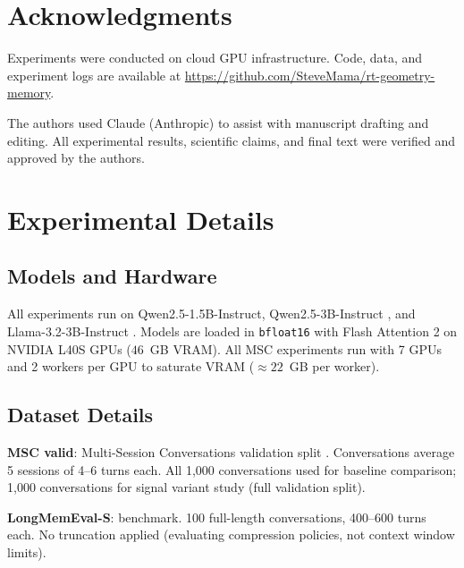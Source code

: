 \documentclass[11pt]{article}
\begin{document}
\section*{Acknowledgments}
Experiments were conducted on cloud GPU infrastructure.
Code, data, and experiment logs are available at \url{https://github.com/SteveMama/rt-geometry-memory}.

The authors used Claude (Anthropic) to assist with manuscript drafting and editing. All experimental results, scientific claims, and final text were verified and approved by the authors.




\appendix

\section{Experimental Details}
\label{app:details}

\subsection{Models and Hardware}
All experiments run on Qwen2.5-1.5B-Instruct, Qwen2.5-3B-Instruct
\citep{qwen2025qwen25technicalreport},
and Llama-3.2-3B-Instruct \citep{grattafiori-etal-2024-llama3}.
Models are loaded in \texttt{bfloat16} with Flash Attention 2
\citep{dao-etal-2022-flashattention}
on NVIDIA L40S GPUs ($46$~GB VRAM).
All MSC experiments run with 7 GPUs and 2 workers per GPU
to saturate VRAM ($\approx 22$~GB per worker).

\subsection{Dataset Details}
\textbf{MSC valid}: Multi-Session Conversations validation split \citep{xu-etal-2022-beyond}.
Conversations average 5 sessions of 4--6 turns each.
All 1{,}000 conversations used for baseline comparison;
1{,}000 conversations for signal variant study (full validation split).

\textbf{LongMemEval-S}: \citet{wu-etal-2025-longmemeval} benchmark.
100 full-length conversations, 400--600 turns each.
No truncation applied (evaluating compression policies, not context window limits).
\end{document}
